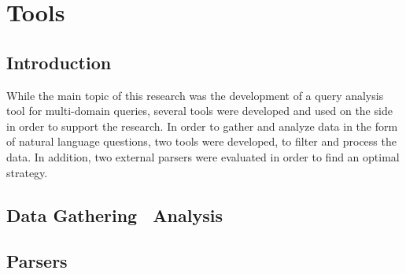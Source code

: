 \chapter{Tools} %
\label{cha:tools}

\section{Introduction} %
\label{sec:introduction_tools}
While the main topic of this research was the development of a query analysis tool for multi-domain queries, several tools were developed and used on the side in order to support the research. In order to gather and analyze data in the form of natural language questions, two tools were developed, to filter and process the data. In addition, two external parsers were evaluated in order to find an optimal strategy.

\section{Data Gathering \amper\ Analysis} %
\label{sec:data_gathering_and_analysis}


\section{Parsers} %
\label{sec:parsers}

